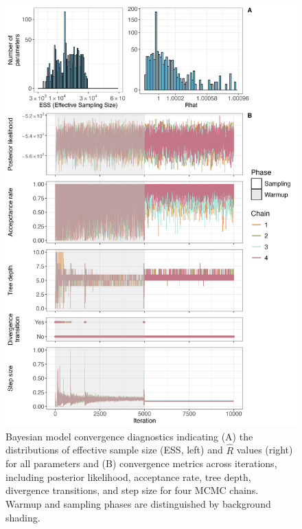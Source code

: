 \documentclass{article}
\begin{document}
\clearpage
\begin{figure}[tbhp] 
\centering
\includegraphics[width=14.2cm]{Plots/Diagnostic_Fig_1.jpg}  
\caption{Bayesian model convergence diagnostics indicating (A) the distributions of effective sample size (ESS, left) and $\hat{R}$ values (right) for all parameters and (B) convergence metrics across iterations, including posterior likelihood, acceptance rate, tree depth, divergence transitions, and step size for four MCMC chains. Warmup and sampling phases are distinguished by background shading.}
\label{fig:diagnostics}
\end{figure}

\end{document}

